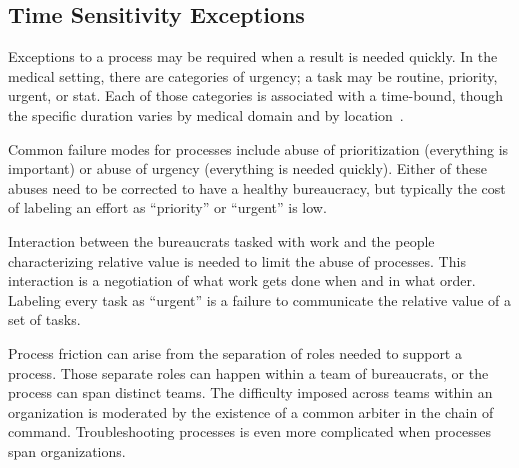 \subsection*{Time Sensitivity Exceptions}
Exceptions to a process may be required when a result is needed quickly. In the medical setting, there are categories of urgency; a task may be routine, priority, urgent, or stat. 
Each of those categories is associated with a time-bound, though the specific duration varies by medical domain and by location~\cite{2022_priority_definitions, 2018_order_priority}.


Common failure modes for processes include abuse of prioritization (everything is important) or abuse of urgency (everything is needed quickly). Either of these abuses need to be corrected to have a healthy bureaucracy, but typically the cost of labeling an effort as ``priority'' or ``urgent'' is low. 

Interaction between the bureaucrats tasked with work and the people characterizing relative value is needed to limit the abuse of processes. This interaction is a negotiation of what work gets done when and in what order. Labeling every task as ``urgent'' is a failure to communicate the relative value of a set of tasks.


Process friction can arise from the separation of roles needed to support a process. Those separate roles can happen within a team of bureaucrats, or the process can span distinct teams. The difficulty imposed across teams within an organization is moderated by the existence of a common arbiter in the chain of command.  
Troubleshooting processes is even more complicated when processes span organizations.  